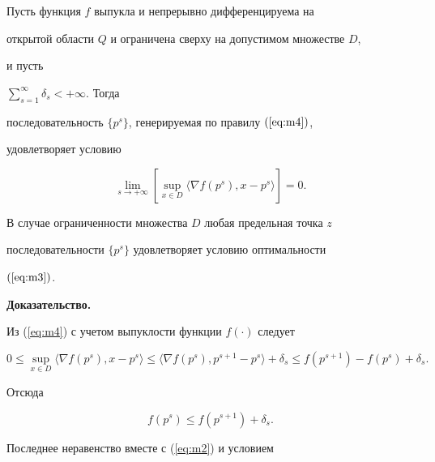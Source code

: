 \begin{prop}


Пусть функция $f$ выпукла и непрерывно дифференцируема на 


открытой области $Q$ и ограничена сверху на допустимом множестве $D$,


и пусть


$\sum\limits_{s=1}^{\infty}\delta_{s}<+\infty$. Тогда


последовательность $\{p^{s}\}$, генерируемая по правилу $(\ref{eq:m4})$,


удовлетворяет условию


\begin{equation}


\lim_{s\rightarrow +\infty}


[\sup_{x \in D} \langle \nabla f(p^{s}), x - p^{s}\rangle]=0 . 


\label{eq:m5}


\end{equation}


 


В случае ограниченности множества $D$ любая предельная точка $z$


последовательности $\{p^s\}$ удовлетворяет условию оптимальности


$(\ref{eq:m3})$. 


\end{prop}





{\bf Доказательство.}


Из (\ref{eq:m4}) с учетом выпуклости функции $f(\cdot)$ следует


\begin{equation}


0\leq\sup_{x \in D} \langle \nabla f(p^{s}), x - p^{s}\rangle\leq 


\langle \nabla f(p^{s}), p^{s+1} - p^{s}\rangle + \delta_{s}\leq


f(p^{s+1})-f(p^{s})+\delta_{s}. 


\label{eq:m6}


\end{equation} 


Отсюда


$$


f(p^{s})\leq f(p^{s+1})+ \delta_{s}.


$$


Последнее неравенство вместе с (\ref{eq:m2}) и условием


